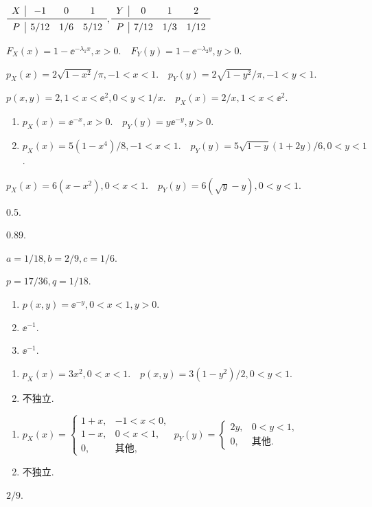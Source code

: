 \begin{answer}
  \item $\begin{array}{c|ccc}
    X & -1 & 0 & 1 \\
    \midrule
    P & 5/12 & 1/6 & 5/12
  \end{array},
  \begin{array}{c|ccc}
    Y & 0 & 1 & 2 \\
    \midrule
    P & 7/12 & 1/3 & 1/12
  \end{array}$
  \item $F_X(x)=1-\ee^{-\lambda_1x},x>0.\quad
  F_Y(y)=1-\ee^{-\lambda_2y},y>0$.
  \item $p_X(x)=2\sqrt{1-x^2}/\pi,-1<x<1.\quad
  p_Y(y)=2\sqrt{1-y^2}/\pi,-1<y<1$.
  \item $p(x,y)=2,1<x<\ee^2,0<y<1/x.\quad p_X(x)=2/x,1<x<\ee^2$.
  \item \begin{enumerate}
    \item $p_X(x)=\ee^{-x},x>0.\quad p_Y(y)=y\ee^{-y},y>0$.
    \item $p_X(x)=5(1-x^4)/8,-1<x<1.\quad
    p_Y(y)=5\sqrt{1-y}(1+2y)/6,0<y<1$.
  \end{enumerate}
  \item $p_X(x)=6(x-x^2),0<x<1.\quad p_Y(y)=6(\sqrt y-y),0<y<1$.
  \item 0.5.
  \item 0.89.
  \item $a=1/18,b=2/9,c=1/6$.
  \item $p=17/36,q=1/18$.
  \item \begin{enumerate}
    \item $p(x,y)=\ee^{-y},0<x<1,y>0$.
    \item $\ee^{-1}$.
    \item $\ee^{-1}$.
  \end{enumerate}
  \item \begin{enumerate}
    \item $p_X(x)=3x^2,0<x<1.\quad p(x,y)=3(1-y^2)/2,0<y<1$.
    \item 不独立.
  \end{enumerate}
  \item \begin{enumerate}
    \item $p_X(x)=\begin{cases}
      1+x, & -1<x<0, \\
      1-x, & 0<x<1, \\
      0, & \text{其他},
    \end{cases}\;p_Y(y)=\begin{cases}
      2y, & 0<y<1, \\
      0, & \text{其他}.
    \end{cases}$
    \item 不独立.
  \end{enumerate}
  \item $2/9$.
\end{answer}

